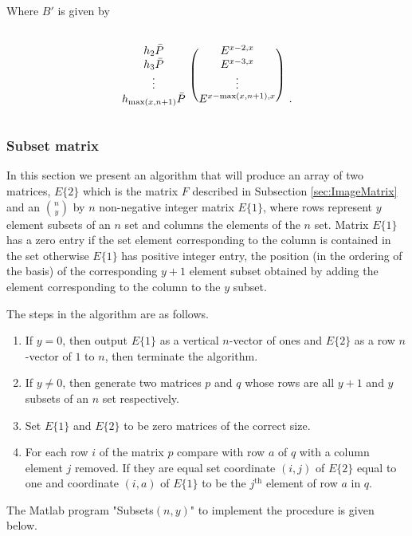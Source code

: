 \documentclass{article}
\theoremstyle{plain}
\theoremstyle{definition}
\numberwithin{thm}{section}
\begin{document}
				Where $B'$ is given by
				
				\[
					\begin{blockarray}{ccc}
						&  & \\
						\begin{block}{c(c)c}
							{h_2\bar{P}} 						 & {E^{x-2,x}}   				&   \\
							{h_3\bar{P}} 						 & {E^{x-3,x}}	   			&   \\
							\vdots									 & \vdots 							&   \\
							{h_{\max(x,n+1)}\bar{P}} & {E^{x-\max(x,n+1),x}}& . \\
						\end{block}
					\end{blockarray}
					\]
			
			\subsubsection{Subset matrix}\label{sec:Subset}
			
				In this section we present an algorithm that will produce an array of two matrices, $E\{ 2 \}$ which is the matrix $F$ described in Subsection \ref{sec:ImageMatrix}
				and an $\binom{n}{y}$ by $n$ non-negative integer matrix $E\{ 1 \}$,
				where rows represent $y$ element subsets of an $n$ set and columns the elements of the $n$ set.
				Matrix $E\{ 1 \}$ has a zero entry if the set element corresponding to the column is contained in the set
				otherwise $E\{ 1 \}$ has positive integer entry, the position (in the ordering of the basis) of the corresponding $y+1$ element subset obtained by 
				adding the element corresponding to the column to the $y$ subset.
				
				The steps in the algorithm are as follows.
				\begin{enumerate}
					\item
					If $y=0$, then output $E\{ 1 \}$ as a vertical $n$-vector of ones and $E\{ 2 \}$ as a row $n$-vector of $1$ to $n$, then terminate the algorithm.
					\item
					If $y\neq 0$, then generate two matrices $p$ and $q$ whose rows are all $y+1$ and $y$ subsets of an $n$ set respectively.
					\item
					Set  $E\{ 1 \}$ and  $E\{ 2 \}$ to be zero matrices of the correct size.
					\item
					For each row $i$ of the matrix $p$ compare with row $a$ of $q$ with a column element $j$ removed.
					If they are equal set coordinate $(i,j)$ of $E\{ 2 \}$ equal to one
					and coordinate $(i,a)$ of $E\{ 1 \}$ to be the $j^{\text{th}}$ element of row $a$ in $q$.  
				\end{enumerate}
				The Matlab program "Subsets$(n,y)$" to implement the procedure is given below.
				
\end{document}

